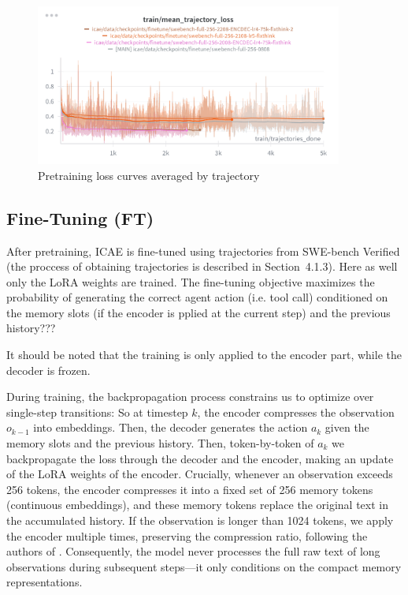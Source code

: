 \begin{figure}[hbt]
  \centering
  \includegraphics[width=0.9\textwidth]{graphs/pt_losses.png}
  \caption{Pretraining loss curves averaged by trajectory}
  \label{fig:pt_losses}
\end{figure}

\subsection{Fine-Tuning (FT)}
After pretraining, ICAE is fine-tuned using trajectories from SWE-bench Verified (the proccess of obtaining trajectories is described in Section~4.1.3).
Here as well only the LoRA weights are trained.
The fine-tuning objective maximizes the probability of generating the correct agent action (i.e. tool call) conditioned on the memory slots (if the encoder is pplied at the current step) and the previous history???

It should be noted that the training is only applied to the encoder part, while the decoder is frozen.


During training, the backpropagation process constrains us to optimize over single-step transitions:
So at timestep \(k\), the encoder compresses the observation \(o_{k-1}\) into embeddings. Then, the decoder generates the action \(a_k\) given the memory slots and the previous history.
Then, token-by-token of \(a_k\) we backpropagate the loss through the decoder and the encoder, making an update of the LoRA weights of the encoder.
Crucially, whenever an observation exceeds 256 tokens, the encoder compresses it into a fixed set of 256 memory tokens (continuous embeddings), and these memory tokens replace the original text in the accumulated history.
If the observation is longer than 1024 tokens, we apply the encoder multiple times, preserving the compression ratio, following the authors of \cite{ge_context_2024}.
Consequently, the model never processes the full raw text of long observations during subsequent steps—it only conditions on the compact memory representations.

